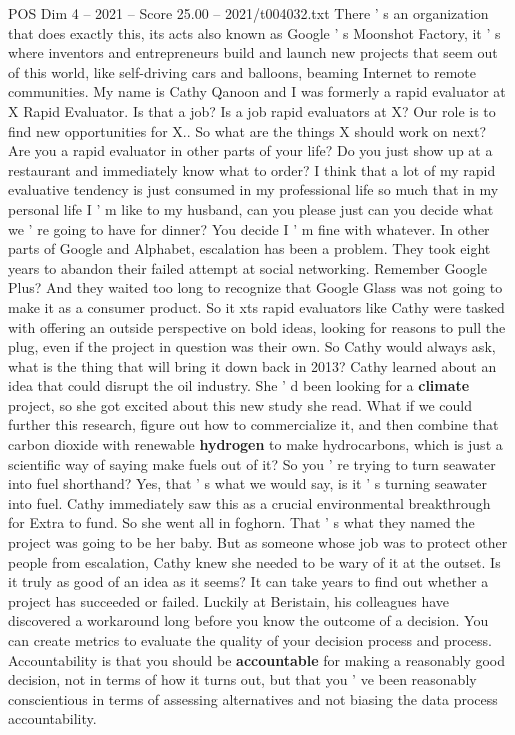 \begin{textsample}{POS Dim 4 – 2021 – Score 25.00 – 2021/t004032.txt}
There ' s an organization that does exactly this, its acts also known as Google ' s Moonshot Factory, it ' s where inventors and entrepreneurs build and launch new projects that seem out of this world, like self-driving cars and balloons, beaming Internet to remote communities.
My name is Cathy Qanoon and I was formerly a rapid evaluator at X Rapid Evaluator.
Is that a job?
Is a job rapid evaluators at X?
Our role is to find new opportunities for X..
So what are the things X should work on next?
Are you a rapid evaluator in other parts of your life?
Do you just show up at a restaurant and immediately know what to order?
I think that a lot of my rapid evaluative tendency is just consumed in my professional life so much that in my personal life I ' m like to my husband, can you please just can you decide what we ' re going to have for dinner?
You decide I ' m fine with whatever.
In other parts of Google and Alphabet, escalation has been a problem.
They took eight years to abandon their failed attempt at social networking.
Remember Google Plus?
And they waited too long to recognize that Google Glass was not going to make it as a consumer product.
So it xts rapid evaluators like Cathy were tasked with offering an outside perspective on bold ideas, looking for reasons to pull the plug, even if the project in question was their own.
So Cathy would always ask, what is the thing that will bring it down back in 2013?
Cathy learned about an idea that could disrupt the oil industry.
She ' d been looking for a \textbf{climate} project, so she got excited about this new study she read.
What if we could further this research, figure out how to commercialize it, and then combine that carbon dioxide with renewable \textbf{hydrogen} to make hydrocarbons, which is just a scientific way of saying make fuels out of it?
So you ' re trying to turn seawater into fuel shorthand?
Yes, that ' s what we would say, is it ' s turning seawater into fuel.
Cathy immediately saw this as a crucial environmental breakthrough for Extra to fund.
So she went all in foghorn.
That ' s what they named the project was going to be her baby.
But as someone whose job was to protect other people from escalation, Cathy knew she needed to be wary of it at the outset.
Is it truly as good of an idea as it seems?
It can take years to find out whether a project has succeeded or failed.
Luckily at Beristain, his colleagues have discovered a workaround long before you know the outcome of a decision.
You can create metrics to evaluate the quality of your decision process and process.
Accountability is that you should be \textbf{accountable} for making a reasonably good decision, not in terms of how it turns out, but that you ' ve been reasonably conscientious in terms of assessing alternatives and not biasing the data process accountability.

\end{textsample}
